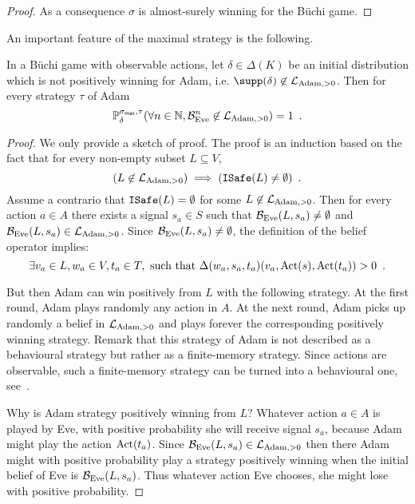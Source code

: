 \begin{proof}
As a consequence $\sigma$ is almost-surely winning for the 
B\"uchi game.
\end{proof}


An important feature of the maximal strategy is the following.
\begin{lemma}
In a B\"uchi game
with observable actions,
let $\delta\in\Delta(K)$ be an initial distribution which is not positively 
winning for Adam,
i.e. $\supp(\delta)\not\in\LLA$.
Then for every strategy $\tau$ of Adam
\begin{equation}
\label{eq:LLstable}
\mathbb{P}^{\sigma_{\textsf{max}},\tau}_{\delta}(\forall n \in \mathbb{N}, \mathcal{B}_{\text{Eve}}^n \not\in\mathcal{L}_{\text{Adam},>0} )=1\enspace.
\end{equation}
\end{lemma}
\begin{proof}
We only provide a sketch of proof.
The proof is an induction based on the fact that for every non-empty subset $L\subseteq V$,
\[
(L\not \in \mathcal{L}_{\text{Adam},>0}) \implies ({\tt ISafe}(L)\neq \emptyset)\enspace.
\]
Assume a contrario that ${\tt ISafe}(L) = \emptyset$ for some $L\not \in \mathcal{L}_{\text{Adam},>0}$.
Then for every action $a\in A$ there exists a signal $s_a\in S$
such that $\mathcal{B}_{\text{Eve}}(L,s_a)\neq \emptyset$ and $\mathcal{B}_{\text{Eve}}(L,s_a) \in \mathcal{L}_{\text{Adam},>0}$.
Since $\mathcal{B}_{\text{Eve}}(L,s_a)\neq \emptyset$, the definition of the belief operator implies:
\[
\exists v_a\in L, w_a\in V,  t_a \in T, \text{ such that }  \Delta(w_a,s_a,t_a)(v_a,\text{Act}(s),\text{Act}(t_a)) > 0\enspace.
\]

But then Adam can win positively from $L$ with the following strategy.
At the first round, Adam plays randomly any action in $A$.
At the next round, Adam picks up randomly a belief in  $\mathcal{L}_{\text{Adam},>0}$ and 
plays forever the corresponding positively winning strategy.
Remark that this strategy of Adam is not described as a behavioural strategy
but rather as a finite-memory strategy. Since actions are observable,
such a finite-memory strategy can be turned into a behavioural one,
see~\cite[Lemma 4.6 and 4.7]{BGGjacm}.

Why is Adam strategy positively winning from $L$?
Whatever action $a\in A$ is played by Eve,
with positive probability she will receive signal $s_a$,
because Adam might play the action $\text{Act}(t_a)$.
Since $\mathcal{B}_{\text{Eve}}(L,s_a) \in \mathcal{L}_{\text{Adam},>0}$ then there Adam might with positive probability
play a strategy positively winning when the initial belief
of Eve is $\mathcal{B}_{\text{Eve}}(L,s_a)$. Thus whatever action Eve chooses,
she might lose with positive probability.

\end{proof}

\medskip 

